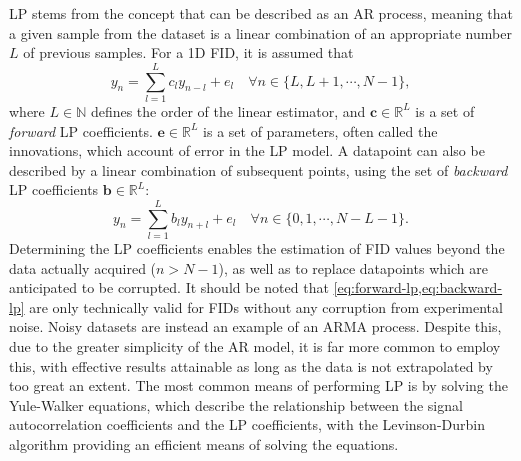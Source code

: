\ac{LP} stems from the concept that  can be described as
an \ac{AR} process, meaning that a given sample from the dataset is a linear
combination of an appropriate number $L$ of previous samples. For a \ac{1D}
\ac{FID}, it is assumed that
\begin{equation}
    y_n = \sum_{l=1}^{L}
    c_l y_{n-l} + e_l \quad
    \forall n \in \lbrace L, L + 1, \cdots, N - 1 \rbrace,
    \label{eq:forward-lp}
\end{equation}
where $L \in
\mathbb{N}$ defines the order of the linear estimator, and $\symbf{c} \in
\mathbb{R}^{L}$ is a set of \emph{forward} \ac{LP} coefficients. $\symbf{e} \in
\mathbb{R}^L$ is a set of parameters, often called the innovations,
which account of error in the \ac{LP} model. A datapoint can also be described
by a linear combination of subsequent points, using the set of \emph{backward}
\ac{LP} coefficients $\symbf{b} \in \mathbb{R}^L$:
\begin{equation}
    y_n = \sum_{l=1}^{L}
    b_l y_{n+l} + e_l \quad
    \forall n \in \lbrace 0, 1, \cdots, N - L - 1 \rbrace.
    \label{eq:backward-lp}
\end{equation}
Determining
the \ac{LP} coefficients enables the estimation of \ac{FID} values beyond the
data actually acquired ($n > N - 1$), as well as to replace
datapoints which are anticipated to be corrupted. It should be noted that
\cref{eq:forward-lp,eq:backward-lp} are only technically valid for
\acp{FID} without any corruption from experimental noise. Noisy datasets are
instead an example of an \ac{ARMA} process. Despite this, due to the greater
simplicity of the \ac{AR} model, it is far more common to employ this, with
effective results attainable as long as the data is not extrapolated by too
great an extent. The most common means of performing \ac{LP} is by solving the
Yule-Walker equations\cite{Yule1927,Walker1931}, which describe the
relationship between the signal autocorrelation coefficients and the \ac{LP}
coefficients\cite[Section 3.3]{Koehl1999}, with the Levinson-Durbin algorithm
providing an efficient means of solving the
equations\cite{Levinson1946,Durbin1960}.

